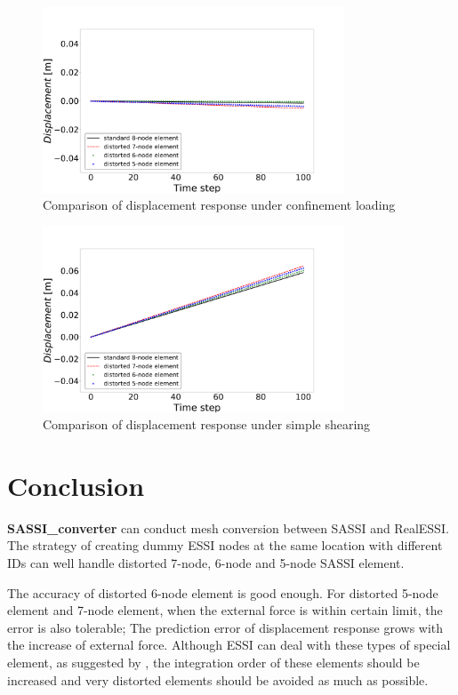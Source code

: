 \documentclass{article}
\begin{document}
\begin{figure}[H]
\begin{center}
\includegraphics[width=0.8\textwidth]{images/confinement_comparison.pdf}
\end{center}
\caption{\label{Fig: confinement comparison result} Comparison of displacement response under confinement loading}
\end{figure}

\begin{figure}[H]
\begin{center}
\includegraphics[width=0.8\textwidth]{images/shearing_comparison.pdf}
\end{center}
\caption{\label{Fig: shearing comparison result} Comparison of displacement response under simple shearing}
\end{figure}

\section{Conclusion}

\textbf{SASSI\_converter} can conduct mesh conversion between SASSI and RealESSI. 
%
The strategy of creating dummy ESSI nodes at the same location with different IDs can well handle distorted 7-node, 6-node and 5-node SASSI element. 

%
The accuracy of distorted 6-node element is good enough. 
%
For distorted 5-node element and 7-node element, when the external force is within certain limit, the error is also tolerable; 
%
The prediction error of displacement response grows with the increase of external force. 
%
Although ESSI can deal with these types of special element, as suggested by \citet{Ostadan2007b}, the integration order of these elements should be increased and very distorted elements should be avoided as much as possible.


\setlength\bibsep{0.3pt}


\end{document}

